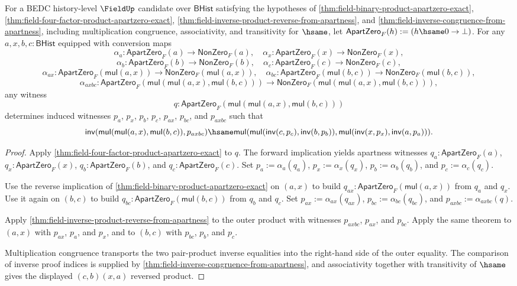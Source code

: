 \begin{theorem}
\label{thm:field-four-factor-product-inverse-reversal-from-apartness}
For a BEDC history-level $\FieldUp$ candidate over $\mathsf{BHist}$
satisfying the hypotheses of
\autoref{thm:field-binary-product-apartzero-exact},
\autoref{thm:field-four-factor-product-apartzero-exact},
\autoref{thm:field-inverse-product-reverse-from-apartness}, and
\autoref{thm:field-inverse-congruence-from-apartness}, including
multiplication congruence, associativity, and transitivity for $\hsame$, let
$\mathsf{ApartZero}_F(h):=(h\hsame0\to\bot)$. For any
$a,x,b,c:\mathsf{BHist}$ equipped with conversion maps
$$
\alpha_a:\mathsf{ApartZero}_F(a)\to\mathsf{NonZero}_F(a),\quad
\alpha_x:\mathsf{ApartZero}_F(x)\to\mathsf{NonZero}_F(x),
$$
$$
\alpha_b:\mathsf{ApartZero}_F(b)\to\mathsf{NonZero}_F(b),\quad
\alpha_c:\mathsf{ApartZero}_F(c)\to\mathsf{NonZero}_F(c),
$$
$$
\alpha_{ax}:\mathsf{ApartZero}_F(\mathsf{mul}(a,x))\to
\mathsf{NonZero}_F(\mathsf{mul}(a,x)),\quad
\alpha_{bc}:\mathsf{ApartZero}_F(\mathsf{mul}(b,c))\to
\mathsf{NonZero}_F(\mathsf{mul}(b,c)),
$$
$$
\alpha_{axbc}:\mathsf{ApartZero}_F(\mathsf{mul}(\mathsf{mul}(a,x),
\mathsf{mul}(b,c)))\to
\mathsf{NonZero}_F(\mathsf{mul}(\mathsf{mul}(a,x),\mathsf{mul}(b,c))),
$$
any witness
$$
q:\mathsf{ApartZero}_F(\mathsf{mul}(\mathsf{mul}(a,x),\mathsf{mul}(b,c)))
$$
determines induced witnesses $p_a$, $p_x$, $p_b$, $p_c$, $p_{ax}$,
$p_{bc}$, and $p_{axbc}$ such that
$$
\mathsf{inv}(\mathsf{mul}(\mathsf{mul}(a,x),\mathsf{mul}(b,c)),p_{axbc})
\hsame
\mathsf{mul}(\mathsf{mul}(\mathsf{inv}(c,p_c),\mathsf{inv}(b,p_b)),
\mathsf{mul}(\mathsf{inv}(x,p_x),\mathsf{inv}(a,p_a))).
$$
\end{theorem}
\begin{proof}
Apply \autoref{thm:field-four-factor-product-apartzero-exact} to $q$. The
forward implication yields apartness witnesses
$q_a:\mathsf{ApartZero}_F(a)$, $q_x:\mathsf{ApartZero}_F(x)$,
$q_b:\mathsf{ApartZero}_F(b)$, and $q_c:\mathsf{ApartZero}_F(c)$.
Set $p_a:=\alpha_a(q_a)$, $p_x:=\alpha_x(q_x)$,
$p_b:=\alpha_b(q_b)$, and $p_c:=\alpha_c(q_c)$.

Use the reverse implication of
\autoref{thm:field-binary-product-apartzero-exact} on $(a,x)$ to build
$q_{ax}:\mathsf{ApartZero}_F(\mathsf{mul}(a,x))$ from $q_a$ and $q_x$.
Use it again on $(b,c)$ to build
$q_{bc}:\mathsf{ApartZero}_F(\mathsf{mul}(b,c))$ from $q_b$ and $q_c$.
Set $p_{ax}:=\alpha_{ax}(q_{ax})$, $p_{bc}:=\alpha_{bc}(q_{bc})$, and
$p_{axbc}:=\alpha_{axbc}(q)$.

Apply \autoref{thm:field-inverse-product-reverse-from-apartness} to the
outer product with witnesses $p_{axbc}$, $p_{ax}$, and $p_{bc}$. Apply the
same theorem to $(a,x)$ with $p_{ax}$, $p_a$, and $p_x$, and to $(b,c)$
with $p_{bc}$, $p_b$, and $p_c$.

Multiplication congruence transports the two pair-product inverse equalities
into the right-hand side of the outer equality. The comparison of inverse
proof indices is supplied by
\autoref{thm:field-inverse-congruence-from-apartness}, and associativity
together with transitivity of $\hsame$ gives the displayed
$(c,b)(x,a)$ reversed product.
\end{proof}

